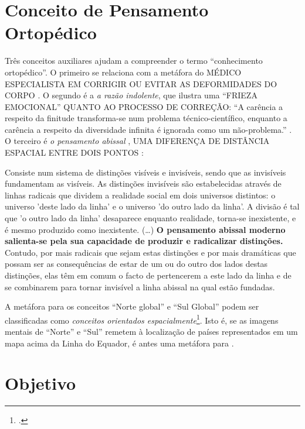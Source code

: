 \section{Conceito de Pensamento Ortopédico}

Três conceitos auxiliares ajudam a compreender o termo ``conhecimento ortopédico''. O primeiro se relaciona com a metáfora do \scriptsize MÉDICO ESPECIALISTA EM CORRIGIR OU EVITAR AS DEFORMIDADES DO CORPO \normalsize {}. O segundo é a \emph{a razão indolente}, que ilustra uma \scriptsize ``FRIEZA EMOCIONAL'' QUANTO AO PROCESSO DE CORREÇÃO\normalsize : ``A carência a respeito da finitude transforma-se num problema técnico-científico, enquanto a carência a respeito da diversidade infinita é ignorada como um não-problema.'' \cite[p.~15]{santos_filosofia_2008}. O terceiro é \emph{o pensamento abissal} \cite[p.~1--4]{santos_abissal_2007}, \scriptsize UMA DIFERENÇA DE DISTÂNCIA ESPACIAL ENTRE DOIS PONTOS \normalsize:

\begin{citacao}
Consiste num sistema de distinções visíveis e invisíveis, sendo que as invisíveis fundamentam as visíveis. As distinções invisíveis são estabelecidas através de linhas radicais que dividem a realidade social em dois universos distintos: o universo  'deste lado da linha' e o universo 'do outro lado da linha'. A divisão é tal que 'o outro lado da linha' desaparece enquanto realidade, torna-se inexistente, e é mesmo produzido como inexistente. (\ldots) \textbf{O pensamento abissal moderno salienta-se pela sua capacidade de produzir e radicalizar distinções.} Contudo, por mais radicais que sejam estas distinções e por mais dramáticas que possam ser as consequências de estar de um ou do outro dos lados destas distinções, elas têm em comum o facto de pertencerem a este lado da linha e de se combinarem para tornar invisível a linha abissal na qual estão fundadas. \end{citacao}

A metáfora para os conceitos ``Norte global'' e ``Sul Global'' podem ser classificadas como \emph{conceitos orientados espacialmente}\footnote{.}. Isto é, se as imagens mentais de ``Norte'' e ``Sul'' remetem à localização de países representados em um mapa acima da Linha do Equador, é antes uma metáfora para .  

\section{Objetivo}

